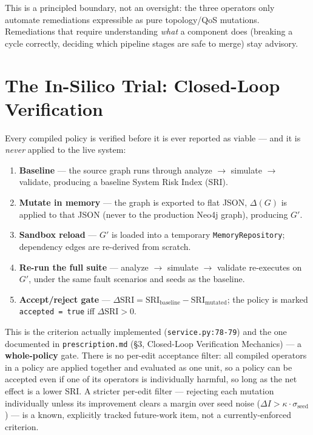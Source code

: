 \documentclass[11pt]{article}
\begin{document}
This is a principled boundary, not an oversight: the three operators only automate remediations expressible as pure topology/QoS mutations. Remediations that require understanding \emph{what} a component does (breaking a cycle correctly, deciding which pipeline stages are safe to merge) stay advisory.

\section{The In-Silico Trial: Closed-Loop Verification}

Every compiled policy is verified before it is ever reported as viable --- and it is \emph{never} applied to the live system:

\begin{enumerate}[leftmargin=*]
\item \textbf{Baseline} --- the source graph runs through analyze $\to$ simulate $\to$ validate, producing a baseline System Risk Index (SRI).
\item \textbf{Mutate in memory} --- the graph is exported to flat JSON, $\Delta(G)$ is applied to that JSON (never to the production Neo4j graph), producing $G'$.
\item \textbf{Sandbox reload} --- $G'$ is loaded into a temporary \texttt{MemoryRepository}; dependency edges are re-derived from scratch.
\item \textbf{Re-run the full suite} --- analyze $\to$ simulate $\to$ validate re-executes on $G'$, under the same fault scenarios and seeds as the baseline.
\item \textbf{Accept/reject gate} --- $\Delta\mathrm{SRI} = \mathrm{SRI}_{\text{baseline}} - \mathrm{SRI}_{\text{mutated}}$; the policy is marked \texttt{accepted = true} iff $\Delta\mathrm{SRI} > 0$.
\end{enumerate}

This is the criterion actually implemented (\texttt{service.py:78-79}) and the one documented in \texttt{prescription.md} (\S3, Closed-Loop Verification Mechanics) --- a \textbf{whole-policy} gate. There is no per-edit acceptance filter: all compiled operators in a policy are applied together and evaluated as one unit, so a policy can be accepted even if one of its operators is individually harmful, so long as the net effect is a lower SRI. A stricter per-edit filter --- rejecting each mutation individually unless its improvement clears a margin over seed noise ($\Delta I > \kappa \cdot \sigma_{\text{seed}}$) --- is a known, explicitly tracked future-work item, not a currently-enforced criterion.
\end{document}
